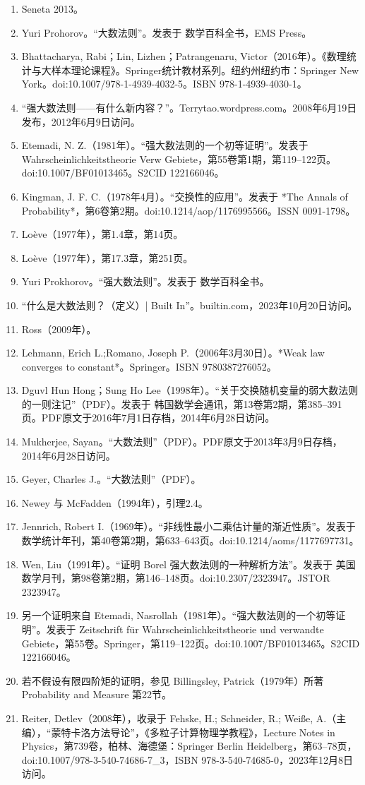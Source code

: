 \begin{enumerate}
\item Seneta 2013。
\item Yuri Prohorov。“大数法则”。发表于 数学百科全书，EMS Press。
\item Bhattacharya, Rabi；Lin, Lizhen；Patrangenaru, Victor（2016年）。《数理统计与大样本理论课程》。Springer统计教材系列。纽约州纽约市：Springer New York。doi:10.1007/978-1-4939-4032-5。ISBN 978-1-4939-4030-1。
\item “强大数法则——有什么新内容？”。Terrytao.wordpress.com。2008年6月19日发布，2012年6月9日访问。
\item Etemadi, N. Z.（1981年）。“强大数法则的一个初等证明”。发表于 Wahrscheinlichkeitstheorie Verw Gebiete，第55卷第1期，第119–122页。doi:10.1007/BF01013465。S2CID 122166046。
\item Kingman, J. F. C.（1978年4月）。“交换性的应用”。发表于 *The Annals of Probability*，第6卷第2期。doi:10.1214/aop/1176995566。ISSN 0091-1798。
\item Loève（1977年），第1.4章，第14页。
\item Loève（1977年），第17.3章，第251页。
\item Yuri Prokhorov。“强大数法则”。发表于 数学百科全书。
\item “什么是大数法则？（定义）| Built In”。builtin.com，2023年10月20日访问。
\item Ross（2009年）。
\item Lehmann, Erich L.;Romano, Joseph P.（2006年3月30日）。*Weak law converges to constant*。Springer。ISBN 9780387276052。
\item Dguvl Hun Hong；Sung Ho Lee（1998年）。“关于交换随机变量的弱大数法则的一则注记”（PDF）。发表于 韩国数学会通讯，第13卷第2期，第385–391页。PDF原文于2016年7月1日存档，2014年6月28日访问。
\item Mukherjee, Sayan。“大数法则”（PDF）。PDF原文于2013年3月9日存档，2014年6月28日访问。
\item Geyer, Charles J.。“大数法则”（PDF）。
\item Newey 与 McFadden（1994年），引理2.4。
\item Jennrich, Robert I.（1969年）。“非线性最小二乘估计量的渐近性质”。发表于 数学统计年刊，第40卷第2期，第633–643页。doi:10.1214/aoms/1177697731。
\item Wen, Liu（1991年）。“证明 Borel 强大数法则的一种解析方法”。发表于 美国数学月刊，第98卷第2期，第146–148页。doi:10.2307/2323947。JSTOR 2323947。
\item 另一个证明来自 Etemadi, Nasrollah（1981年）。“强大数法则的一个初等证明”。发表于 Zeitschrift für Wahrscheinlichkeitstheorie und verwandte Gebiete，第55卷。Springer，第119–122页。doi:10.1007/BF01013465。S2CID 122166046。
\item 若不假设有限四阶矩的证明，参见 Billingsley, Patrick（1979年）所著 Probability and Measure 第22节。
\item Reiter, Detlev（2008年），收录于 Fehske, H.; Schneider, R.; Weiße, A.（主编），“蒙特卡洛方法导论”，《多粒子计算物理学教程》，Lecture Notes in Physics，第739卷，柏林、海德堡：Springer Berlin Heidelberg，第63–78页，doi:10.1007/978-3-540-74686-7\_3，ISBN 978-3-540-74685-0，2023年12月8日访问。
\end{enumerate}

